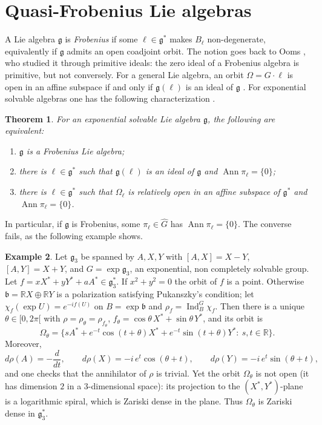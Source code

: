 \documentclass[11pt]{amsart}
\theoremstyle{plain}
\newtheorem{thm}{Theorem}[section]
\theoremstyle{definition}
\newtheorem{exam}[thm]{Example}
\theoremstyle{remark}
\newcommand{\g}{\mathfrak g}
\newcommand{\bb}{\mathfrak b}
\newcommand{\RR}{\mathbb R}
\newcommand{\Ann}{\operatorname{Ann}}
\newcommand{\Ind}{\operatorname{Ind}}
\begin{document}
	\section{Quasi-Frobenius  Lie algebras}\label{sect:QF}
	
	A Lie algebra $\g$ is \emph{Frobenius} if some $\ell\in\g^*$ makes $B_\ell$ non-degenerate, equivalently if $\g$ admits an open coadjoint orbit. The notion goes back to Ooms \cite{O74,O80}, who studied it through primitive ideals: the zero ideal of a Frobenius algebra is primitive, but not conversely. For a general Lie algebra, an orbit $\Omega=G\cdot\ell$ is open in an affine subspace if and only if $\g(\ell)$ is an ideal of $\g$ \cite[Prop.~3.1]{Bak-Ishi}. For exponential solvable algebras one has the following characterization \cite[Thm.~1.1]{Bak-Ishi}.
	
	\begin{thm}\label{char Frob Exp}
		For an exponential solvable Lie algebra $\g$, the following are equivalent:
		\begin{enumerate}
			\item $\g$ is a Frobenius Lie algebra;
			\item there is $\ell\in\g^*$ such that $\g(\ell)$ is an ideal of $\g$ and $\Ann \pi_\ell=\{0\}$;
			\item there is $\ell\in\g^*$ such that $\Omega_\ell$ is relatively open in an affine subspace of $\g^*$ and $\Ann\pi_\ell=\{0\}$.
		\end{enumerate}
	\end{thm}
	
	In particular, if $\g$ is Frobenius, some $\pi_\ell\in\widehat G$ has $\Ann \pi_\ell=\{0\}$. The converse fails, as the following example shows.
	
	\begin{exam}\label{Example 1}
		Let $\g_3$ be spanned by $A,X,Y$ with $[A,X]=X-Y$, $[A,Y]=X+Y$, and $G=\exp\g_3$, an exponential, non completely solvable group. Let $f=xX^*+yY^*+aA^*\in\g_3^*$. If $x^2+y^2=0$ the orbit of $f$ is a point. Otherwise $\bb=\RR X\oplus\RR Y$ is a polarization satisfying Pukanszky's condition; let $\chi_f(\exp U)=e^{-if(U)}$ on $B=\exp\bb$ and $\rho_f=\Ind_B^G\chi_f$. Then there is a unique $\theta\in[0,2\pi[$ with $\rho=\rho_\theta=\rho_{f_\theta}$, $f_\theta=\cos\theta\,X^*+\sin\theta\,Y^*$, and its orbit is
		\[
		\Omega_\theta=\big\{sA^*+e^{-t}\cos(t+\theta)X^*+e^{-t}\sin(t+\theta)Y^*:\ s,t\in\RR\big\}.
		\]
		Moreover,
		\[
		d\rho(A)=-\frac{d}{dt},\qquad d\rho(X)=-i\,e^{t}\cos(\theta+t),\qquad d\rho(Y)=-i\,e^{t}\sin(\theta+t),
		\]
		and one checks that the annihilator of $\rho$ is trivial. Yet the orbit $\Omega_\theta$ is not open (it has dimension $2$ in a $3$-dimensional space): its projection to the $(X^*,Y^*)$-plane is a logarithmic spiral, which is Zariski dense in the plane. Thus $\Omega_\theta$ is Zariski dense in $\g_3^*$.
	\end{exam}
	
\end{document}
